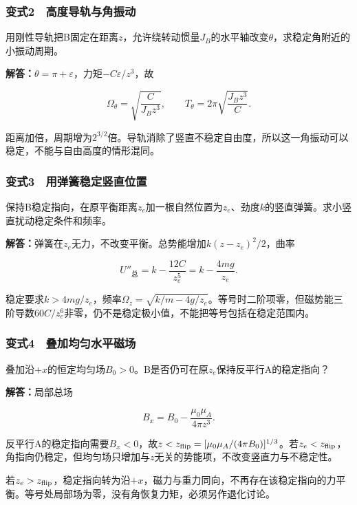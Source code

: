 \documentclass[12pt,a4paper,fontset=fandol]{ctexart}
\begin{document}
\subsubsection{变式2　高度导轨与角振动}\label{ux53d8ux5f0f2-ux9ad8ux5ea6ux5bfcux8f68ux4e0eux89d2ux632fux52a8}

用刚性导轨把B固定在距离\(z\)，允许绕转动惯量\(J_B\)的水平轴改变\(\theta\)，求稳定角附近的小振动周期。

\textbf{解答：}\(\theta=\pi+\varepsilon\)，力矩\(-C\varepsilon/z^3\)，故

\[
\Omega_\theta=\sqrt{\frac C{J_Bz^3}},\qquad
T_\theta=2\pi\sqrt{\frac{J_Bz^3}{C}}.
\]

距离加倍，周期增为\(2^{3/2}\)倍。导轨消除了竖直不稳定自由度，所以这一角振动可以稳定，不能与自由高度的情形混同。

\subsubsection{变式3　用弹簧稳定竖直位置}\label{ux53d8ux5f0f3-ux7528ux5f39ux7c27ux7a33ux5b9aux7ad6ux76f4ux4f4dux7f6e}

保持B稳定指向，在原平衡距离\(z_e\)加一根自然位置为\(z_e\)、劲度\(k\)的竖直弹簧。求小竖直扰动稳定条件和频率。

\textbf{解答：}弹簧在\(z_e\)无力，不改变平衡。总势能增加\(k(z-z_e)^2/2\)，曲率

\[
U''_{\text{总}}=k-\frac{12C}{z_e^5}
=k-\frac{4mg}{z_e}.
\]

稳定要求\(k>4mg/z_e\)，频率\(\Omega_z=\sqrt{k/m-4g/z_e}\)。等号时二阶项零，但磁势能三阶导数\(60C/z_e^6\)非零，仍不是稳定极小值，不能把等号包括在稳定范围内。

\subsubsection{变式4　叠加均匀水平磁场}\label{ux53d8ux5f0f4-ux53e0ux52a0ux5747ux5300ux6c34ux5e73ux78c1ux573a}

叠加沿\(+x\)的恒定均匀场\(B_0>0\)。B是否仍可在原\(z_e\)保持反平行A的稳定指向？

\textbf{解答：}局部总场

\[
B_x=B_0-\frac{\mu_0\mu_A}{4\pi z^3}.
\]

反平行A的稳定指向需要\(B_x<0\)，故\(z<z_{\rm flip}=[\mu_0\mu_A/(4\pi B_0)]^{1/3}\)。若\(z_e<z_{\rm flip}\)，角指向仍稳定，但均匀场只增加与\(z\)无关的势能项，不改变竖直力与不稳定性。

若\(z_e>z_{\rm flip}\)，稳定指向转为沿\(+x\)，磁力与重力同向，不再存在该稳定指向的力平衡。等号处局部场为零，没有角恢复力矩，必须另作退化讨论。
\end{document}
